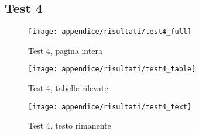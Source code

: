 \newpage
\subsection{Test 4}
\begin{figure}[H] 
    \centering
    \texttt{[image: appendice/risultati/test4\_full]} 
    \caption{Test 4, pagina intera}
    \label{img:test-0-full}
\end{figure} 
\newpage
\begin{figure}[H]  
        \centering  
        \texttt{[image: appendice/risultati/test4\_table]}  
        \caption{Test 4, tabelle rilevate}
\end{figure}
\begin{figure}[H]
        \centering  
        \texttt{[image: appendice/risultati/test4\_text]}  
        \caption{Test 4, testo rimanente}
\end{figure}%
